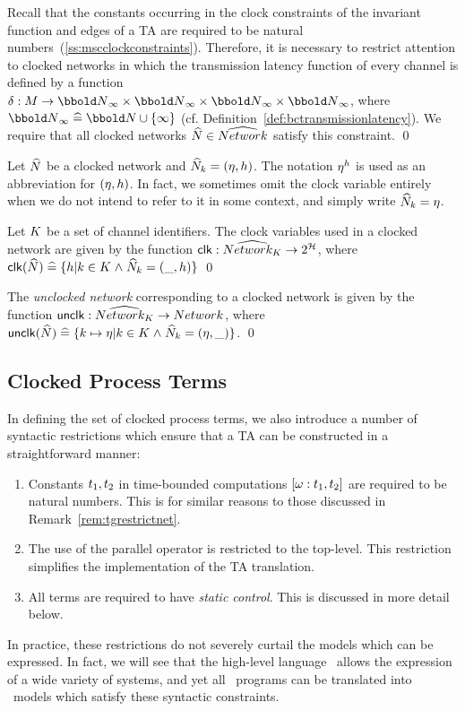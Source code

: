 \begin{remark}\label{rem:tgrestrictnet}
Recall that the constants occurring in 
the clock constraints of the invariant function and edges of a TA
are required to be natural numbers~(\Sec\ref{ss:mscclockconstraints}).
Therefore, it is necessary to restrict attention to clocked networks
in which the transmission latency function of every channel is defined
by a function $\latency : \M \fun \Ninf \cross \Ninf \cross \Ninf
\cross \Ninf$, where $\Ninf \defs \nat \cup \{\infinity\}$ (cf.
Definition~\ref{def:bctransmissionlatency}). We require that all
clocked networks ${\widehat{N}} \in \widehat{Network_{}}$ satisfy this constraint.
\qed
\end{remark}
\begin{notation}
Let ${\widehat{N}}$ be a clocked network and ${\widehat{N}}_{k} = (\eta,h)$.
The notation $\eta^h$ is used as an abbreviation for
$(\eta,h)$. In fact, we sometimes omit the clock variable
entirely when we do not intend to refer to it in some context, and
simply write ${\widehat{N}}_{k} = \eta$.
\end{notation}
\begin{definition}
Let ${K}$ be a set of channel identifiers.
The clock variables used in a clocked network are given by the
function $\clk : \NNetwork{\K} \fun 2^\clocks$, where 
${\mathop{\sf clk}}({\widehat{N}}) \mathrel{\widehat=} \{h | {k} \in {K} \mathrel{\wedge} {\widehat{N}}_{k} = (\_,h)\}$
\qed
\end{definition}
\begin{definition}
The \emph{unclocked network} corresponding to a clocked network
is given by the function ${\mathop{{\sf unclk}}} : \widehat{Network_{{K}}} \rightarrow {Network_{}}$, where 
${\mathop{{\sf unclk}}}({\widehat{N}}) \mathrel{\widehat=} \{{k} \mapsto \eta | {k} \in {K} \mathrel{\wedge} {\widehat{N}}_{k} = 
  (\eta,\_)\}$.
\qed
\end{definition}

\subsection{Clocked Process Terms}\label{ss:tgexpclocksproc}
In defining the set of clocked process terms, we also introduce a
number of syntactic restrictions which ensure that a TA can be
constructed in a straightforward manner:
\begin{enumerate}
\item Constants ${t}_1, {t}_2$ in time-bounded computations 
$[\omega:{t}_1,{t}_2]$ are required to be 
natural numbers. This is for similar reasons to those discussed
in Remark~\ref{rem:tgrestrictnet}. 
\item The use of the parallel operator is restricted to the top-level. This
restriction simplifies the implementation of the TA translation.
\item All terms are required to have \emph{static control}. This
is discussed in more detail below.
\end{enumerate}
In practice, these restrictions do not
severely curtail the models which can be expressed.
In fact, we will see that the high-level language \candle\ allows the
expression of a wide variety of systems, and yet all \candle\ programs 
can be translated into \bcandle\ models which satisfy these syntactic
constraints.

